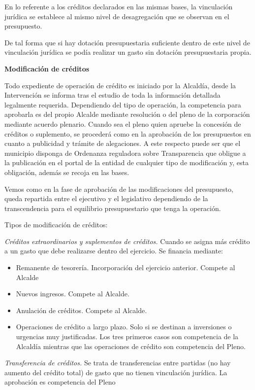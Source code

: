 \documentclass[
]{article}
\begin{document}
En lo referente a los créditos declarados en las mismas bases, la
vinculación jurídica se establece al mismo nivel de desagregación que se
observan en el presupuesto.

De tal forma que si hay dotación presupuestaria suficiente dentro de
este nivel de vinculación jurídica se podía realizar un gasto sin
dotación presupuestaria propia.

\textbf{Modificación de créditos}

Todo expediente de operación de crédito es iniciado por la Alcaldía,
desde la Intervención se informa tras el estudio de toda la información
detallada legalmente requerida. Dependiendo del tipo de operación, la
competencia para aprobarla es del propio Alcalde mediante resolución o
del pleno de la corporación mediante acuerdo plenario. Cuando sea el
pleno quien apruebe la concesión de créditos o suplemento, se procederá
como en la aprobación de los presupuestos en cuanto a publicidad y
trámite de alegaciones. A este respecto puede ser que el municipio
disponga de Ordenanza reguladora sobre Transparencia que obligue a la
publicación en el portal de la entidad de cualquier tipo de modificación
y, esta obligación, además se recoja en las bases.

Vemos como en la fase de aprobación de las modificaciones del
presupuesto, queda repartida entre el ejecutivo y el legislativo
dependiendo de la transcendencia para el equilibrio presupuestario que
tenga la operación.

Tipos de modificación de créditos:

\emph{Créditos extraordinarios y suplementos de créditos.} Cuando se
asigna más crédito a un gasto que debe realizarse dentro del ejercicio.
Se financia mediante:

\begin{itemize}
\item
  Remanente de tesorería. Incorporación del ejercicio anterior. Compete
  al Alcalde
\item
  Nuevos ingresos. Compete al Alcalde.
\item
  Anulación de créditos. Compete al Alcalde.
\item
  Operaciones de crédito a largo plazo. Solo si se destinan a
  inversiones o urgencias muy justificadas. Los tres primeros casos son
  competencia de la Alcaldía mientras que las operaciones de crédito son
  competencia del Pleno.
\end{itemize}

\emph{Transferencia de créditos.} Se trata de transferencias entre
partidas (no hay aumento del crédito total) de gasto que no tienen
vinculación jurídica. La aprobación es competencia del Pleno
\end{document}
